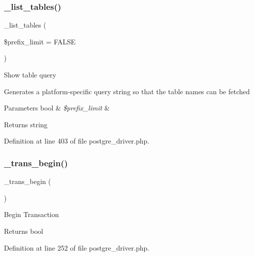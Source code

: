 \subsubsection{\texorpdfstring{\_list\_tables()}{\_list\_tables()}}
{\footnotesize\ttfamily \+\_\+list\+\_\+tables (\begin{DoxyParamCaption}\item[{}]{\$prefix\+\_\+limit = {\ttfamily FALSE} }\end{DoxyParamCaption})\hspace{0.3cm}{\ttfamily [protected]}}

Show table query

Generates a platform-\/specific query string so that the table names can be fetched


\begin{DoxyParams}[1]{Parameters}
bool & {\em \$prefix\+\_\+limit} & \\
\hline
\end{DoxyParams}
\begin{DoxyReturn}{Returns}
string 
\end{DoxyReturn}


Definition at line 403 of file postgre\+\_\+driver.\+php.

\mbox{\label{class_c_i___d_b__postgre__driver_ac81ac882c1d54347d810199a15856aac}} 
\subsubsection{\texorpdfstring{\_trans\_begin()}{\_trans\_begin()}}
{\footnotesize\ttfamily \+\_\+trans\+\_\+begin (\begin{DoxyParamCaption}{ }\end{DoxyParamCaption})\hspace{0.3cm}{\ttfamily [protected]}}

Begin Transaction

\begin{DoxyReturn}{Returns}
bool 
\end{DoxyReturn}


Definition at line 252 of file postgre\+\_\+driver.\+php.

\mbox{\label{class_c_i___d_b__postgre__driver_a6fe7f373e0b11cfae23a5f41c0b35dda}} 
